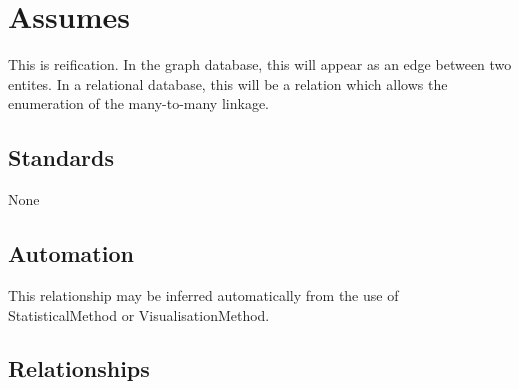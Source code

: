 \section{Assumes}\label{assumes}

This is reification. In the graph database, this will appear as an edge
between two entites. In a relational database, this will be a relation
which allows the enumeration of the many-to-many linkage.

\subsection{Standards}\label{standards-4}

None

\subsection{Automation}\label{automation-4}

This relationship may be inferred automatically from the use of
StatisticalMethod or VisualisationMethod.

\subsection{Relationships}\label{relationships-3}

